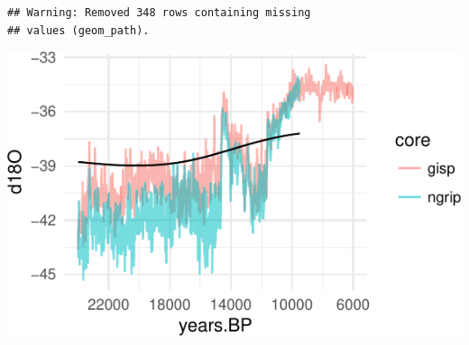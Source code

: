 \documentclass[11pt,]{tufte-handout}
\begin{document}
\begin{verbatim}
## Warning: Removed 348 rows containing missing
## values (geom_path).
\end{verbatim}

\includegraphics{proxymodelcomparison_files/figure-latex/unnamed-chunk-14-1}
\end{document}
